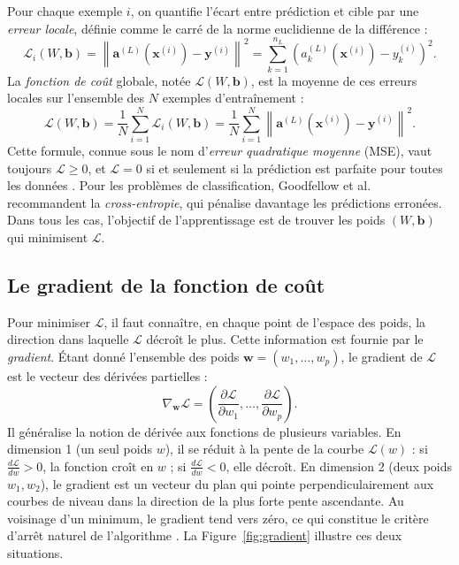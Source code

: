 \documentclass[a4paper,french]{style-LaTeX}
\begin{document}
Pour chaque exemple $i$, on quantifie l'écart entre prédiction et cible par une \emph{erreur locale}, définie comme le carré de la norme euclidienne de la différence :
\begin{equation*}
  \mathcal{L}_i(W, \mathbf{b}) = \left\| \mathbf{a}^{(L)}(\mathbf{x}^{(i)}) - \mathbf{y}^{(i)} \right\|^2
  = \sum_{k=1}^{n_L} \left( a_k^{(L)}(\mathbf{x}^{(i)}) - y_k^{(i)} \right)^2.
\end{equation*}
La \emph{fonction de coût} globale, notée $\mathcal{L}(W, \mathbf{b})$, est la moyenne de ces erreurs locales sur l'ensemble des $N$ exemples d'entraînement :
\begin{equation}
  \mathcal{L}(W, \mathbf{b}) = \frac{1}{N} \sum_{i=1}^{N} \mathcal{L}_i(W, \mathbf{b})
  = \frac{1}{N} \sum_{i=1}^{N} \left\| \mathbf{a}^{(L)}(\mathbf{x}^{(i)}) - \mathbf{y}^{(i)} \right\|^2.
  \label{eq:cout}
\end{equation}
Cette formule, connue sous le nom d'\emph{erreur quadratique moyenne} (MSE), vaut toujours $\mathcal{L} \geq 0$, et $\mathcal{L} = 0$ si et seulement si la prédiction est parfaite pour toutes les données \cite{Exo7deepmath}. Pour les problèmes de classification, Goodfellow et al. \cite{Goodfellow16} recommandent la \emph{cross-entropie}, qui pénalise davantage les prédictions erronées. Dans tous les cas, l'objectif de l'apprentissage est de trouver les poids $(W, \mathbf{b})$ qui minimisent $\mathcal{L}$.

\subsection*{Le gradient de la fonction de coût}

Pour minimiser $\mathcal{L}$, il faut connaître, en chaque point de l'espace des poids, la direction dans laquelle $\mathcal{L}$ décroît le plus. Cette information est fournie par le \emph{gradient}. Étant donné l'ensemble des poids $\mathbf{w} = (w_1, \ldots, w_p)$, le gradient de $\mathcal{L}$ est le vecteur des dérivées partielles :
\begin{equation*}
  \nabla_\mathbf{w} \mathcal{L} = \left(\frac{\partial \mathcal{L}}{\partial w_1}, \ldots, \frac{\partial \mathcal{L}}{\partial w_p}\right).
\end{equation*}
Il généralise la notion de dérivée aux fonctions de plusieurs variables. En dimension 1 (un seul poids $w$), il se réduit à la pente de la courbe $\mathcal{L}(w)$ : si $\frac{d\mathcal{L}}{dw} > 0$, la fonction croît en $w$ ; si $\frac{d\mathcal{L}}{dw} < 0$, elle décroît. En dimension 2 (deux poids $w_1, w_2$), le gradient est un vecteur du plan qui pointe perpendiculairement aux courbes de niveau dans la direction de la plus forte pente ascendante. Au voisinage d'un minimum, le gradient tend vers zéro, ce qui constitue le critère d'arrêt naturel de l'algorithme \cite{Exo7deepmath}. La Figure~\ref{fig:gradient} illustre ces deux situations.
\end{document}
